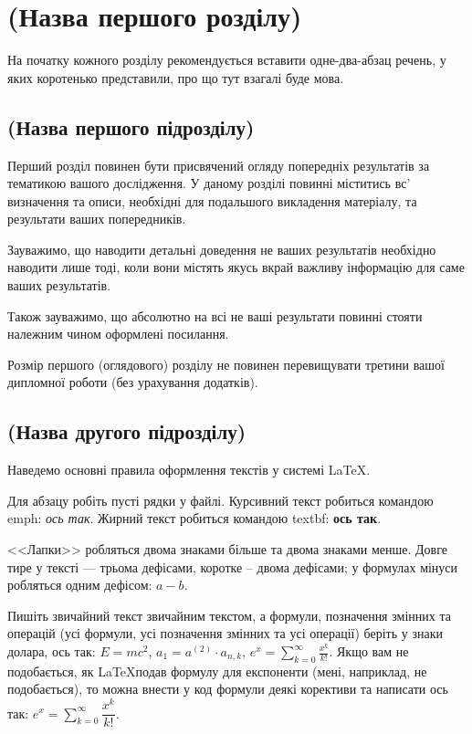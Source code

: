
\chapter{(Назва першого розділу)}
\label{chap:review}  %

На початку кожного розділу рекомендується вставити одне-два-абзац речень,
у яких коротенько представили, про що тут взагалі буде мова.

\section{(Назва першого підрозділу)}

Перший розділ повинен бути присвячений огляду попередніх результатів за
тематикою вашого дослідження. У даному розділі повинні міститись вс'
визначення та описи, необхідні для подальшого викладення матеріалу, та результати
ваших попередників.

Зауважимо, що наводити детальні доведення не ваших результатів необхідно
наводити лише тоді, коли вони містять якусь вкрай важливу інформацію для
саме ваших результатів.

Також зауважимо, що абсолютно на всі не ваші результати повинні стояти
належним чином оформлені посилання.

Розмір першого (оглядового) розділу не повинен перевищувати третини вашої
дипломної роботи (без урахування додатків).


\section{(Назва другого підрозділу)}

Наведемо основні правила оформлення текстів у системі \LaTeX.

Для абзацу робіть пусті рядки у файлі. Курсивний текст робиться командою
emph: \emph{ось так}. Жирний текст робиться командою textbf: \textbf{ось так}.

<<Лапки>> робляться двома знаками більше та двома знаками менше. Довге
тире у тексті --- трьома дефісами, коротке -- двома дефісами; у формулах
мінуси робляться одним дефісом: $a-b$.

Пишіть звичайний текст звичайним текстом, а формули, позначення змінних та
операцій (усі формули, усі позначення змінних та усі операції) беріть у
знаки долара, ось так: $E = mc^2$, $a_1 = a^{(2)} \cdot a_{n, k}$, $e^x =
\sum_{k = 0}^{\infty} {\frac{x^k}{k!}}$. Якщо вам
не подобається, як \LaTeX подав формулу для експоненти (мені, наприклад,
не подобається), то можна внести у код формули деякі корективи та написати ось так: $e^x
= \sum\limits_{k = 0}^{\infty} {\dfrac{x^k}{k!}}$.

